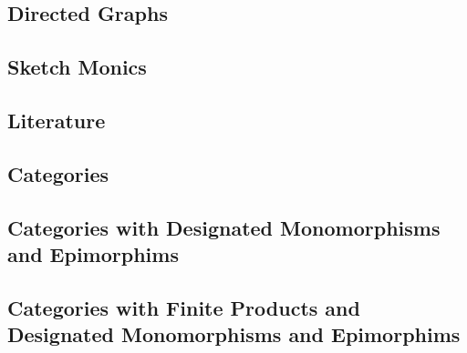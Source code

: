 \subsection{Directed Graphs}


\subsection{Sketch Monics}


\subsection{Literature}


\subsection{Categories}


\subsection{Categories with Designated Monomorphisms and Epimorphims}


\subsection{Categories with Finite Products and Designated Monomorphisms and Epimorphims}


\iffalse
\subsection{Entity-Relationship Notation}


\subsection{Unused}

\fi

\iffalse
\begin{frame}{Bibliography}

\end{frame}
\fi


